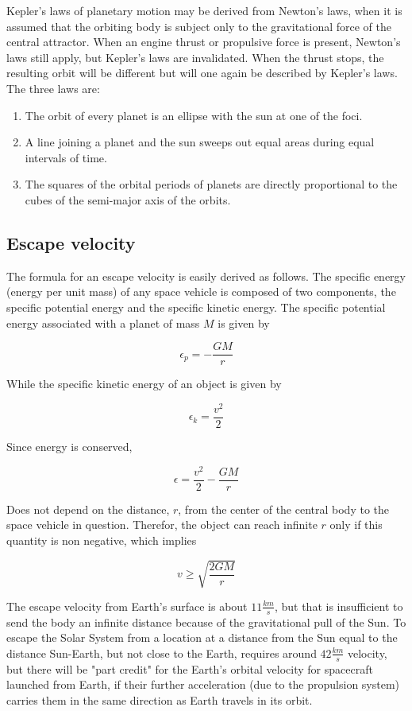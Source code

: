 \documentclass[12pt]{article}
\begin{document}
Kepler's laws of planetary motion may be derived from Newton's laws, when it is assumed that the orbiting body is subject only to the gravitational force of the central attractor. When an engine thrust or propulsive force is present, Newton's laws still apply, but Kepler's laws are invalidated. When the thrust stops, the resulting orbit will be different but will one again be described by Kepler's laws. The three laws are:

\begin{enumerate}
  \item The orbit of every planet is an ellipse with the sun at one of the foci.
  \item A line joining a planet and the sun sweeps out equal areas during equal intervals of time.
  \item The squares of the orbital periods of planets are directly proportional to the cubes of the semi-major axis of the orbits.
\end{enumerate}
\subsection{Escape velocity}

The formula for an escape velocity is easily derived as follows. The specific energy (energy per unit mass) of any space vehicle is composed of two components, the specific potential energy and the specific kinetic energy. The specific potential energy associated with a planet of mass \(M\) is given by

\[\epsilon_{p}=-\frac{GM}{r}\]

While the specific kinetic energy of an object is given by

\[\epsilon_{k}=\frac{v^{2}}{2}\]

Since energy is conserved,

\[\epsilon=\frac{v^{2}}{2}-\frac{GM}{r}\]

Does not depend on the distance, \(r\), from the center of the central body to the space vehicle in question. Therefor, the object can reach infinite \(r\) only if this quantity is non negative, which implies

\[v\geq\sqrt{\frac{2GM}{r}}\]

The escape velocity from Earth's surface is about \(11\frac{km}{s}\), but that is insufficient to send the body an infinite distance because of the gravitational pull of the Sun. To escape the Solar System from a location at a distance from the Sun equal to the distance Sun-Earth, but not close to the Earth, requires around \(42\frac{km}{s}\) velocity, but there will be "part credit" for the Earth's orbital velocity for spacecraft launched from Earth, if their further acceleration (due to the propulsion system) carries them in the same direction as Earth travels in its orbit.
\end{document}

